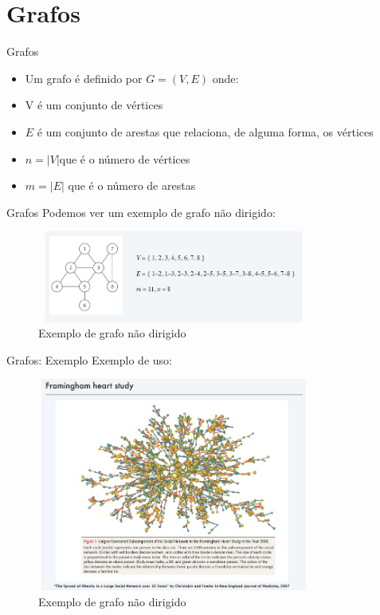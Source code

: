 \section{Grafos}

\begin{frame}
	\begin{block}{Grafos}
		\begin{itemize}
			\item Um grafo é definido por $G = (V, E)$ onde: 
			\item V é um conjunto de vértices
			\item $E$ é um conjunto de arestas que relaciona, de alguma forma, os vértices
			\item $n = |V|$que é o número de vértices
			\item $m = |E|$ que é o número de arestas
		\end{itemize}
	\end{block}
\end{frame}

\begin{frame}
	\begin{block}{Grafos}
		Podemos ver um exemplo de grafo não dirigido:
		\begin{figure}[!htb]
			\centering	  				
			\includegraphics[height=3cm, width = 9cm]{./pic/grafoNaoDirigido.jpg}
			\caption{Exemplo de grafo não dirigido \cite{GEEKS_2018}}
		\end{figure}
	\end{block}
\end{frame}

\begin{frame}
	\begin{block}{Grafos: Exemplo}
		Exemplo de uso:
		\begin{figure}[!htb]
			\centering	  				
			\includegraphics[height=7cm, width = 9cm]{./pic/exemploGrafo.jpg}
			\caption{Exemplo de grafo não dirigido \cite{GEEKS_2018}}
		\end{figure}
	\end{block}
\end{frame}



